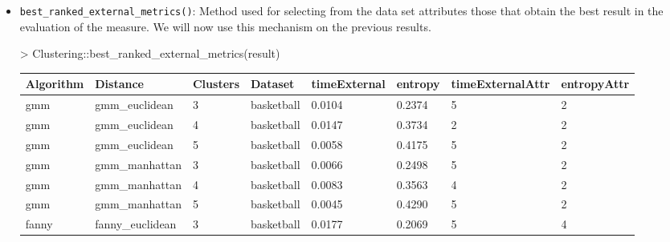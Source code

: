 \begin{itemize}
  \item \texttt{best\_ranked\_external\_metrics()}: Method used for selecting from the data set attributes those that obtain the best result in the evaluation of the measure. We will now use this mechanism on the previous results.

  \begin{Schunk}
\begin{Sinput}
> Clustering::best_ranked_external_metrics(result)
\end{Sinput}
\end{Schunk}
{\small
\begin{longtable}{| p{1cm} | p{1.8cm} | p{0.9cm} | p{1.1cm} | p{1.6cm} | p{0.8cm} | p{1.8cm} | p{1.5cm} |}
\hline
\scriptsize Algorithm  & \scriptsize     Distance    &  \scriptsize Clusters &  \scriptsize  Dataset   & \scriptsize timeExternal  & \scriptsize entropy   & \scriptsize timeExternalAttr & \scriptsize entropyAttr \\
\hline
\scriptsize   gmm      & \scriptsize   gmm\_euclidean & \scriptsize     3     & \scriptsize basketball  & \scriptsize     0.0104    & \scriptsize 0.2374 &  \scriptsize        5        & \scriptsize      2 \\
\scriptsize   gmm      & \scriptsize   gmm\_euclidean & \scriptsize     4     & \scriptsize basketball  & \scriptsize     0.0147    & \scriptsize 0.3734 &  \scriptsize        2        & \scriptsize      2\\
\scriptsize   gmm      & \scriptsize   gmm\_euclidean & \scriptsize     5     & \scriptsize basketball  & \scriptsize     0.0058    & \scriptsize 0.4175 &  \scriptsize        5        & \scriptsize      2 \\
\cline{2-8}
\scriptsize   gmm      & \scriptsize   gmm\_manhattan & \scriptsize     3     & \scriptsize basketball  & \scriptsize     0.0066    & \scriptsize 0.2498 &  \scriptsize        5        & \scriptsize      2 \\
\scriptsize   gmm      & \scriptsize   gmm\_manhattan & \scriptsize     4     & \scriptsize basketball  & \scriptsize     0.0083    & \scriptsize 0.3563 &  \scriptsize        4        & \scriptsize      2 \\
\scriptsize   gmm      & \scriptsize   gmm\_manhattan & \scriptsize     5     & \scriptsize basketball  & \scriptsize     0.0045    & \scriptsize 0.4290 &  \scriptsize        5        & \scriptsize      2 \\
\hline
\scriptsize fanny      & \scriptsize fanny\_euclidean & \scriptsize     3     & \scriptsize basketball  & \scriptsize     0.0177    & \scriptsize 0.2069 &  \scriptsize        5        & \scriptsize      4 \\

\end{longtable}}
\end{itemize}
